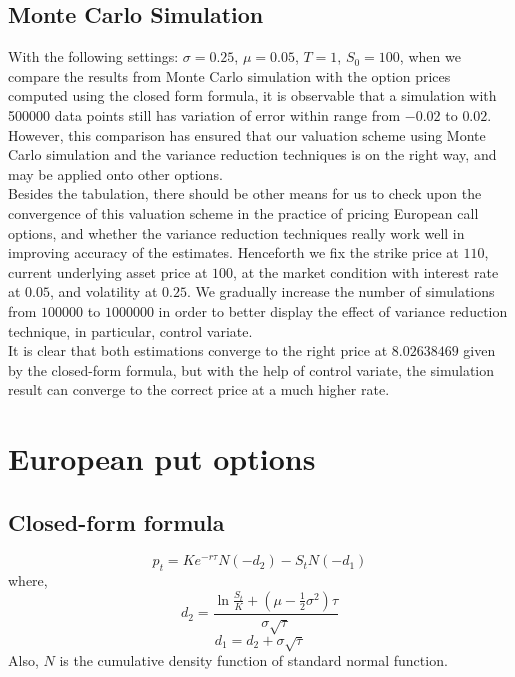 \subsection*{Monte Carlo Simulation}
With the following settings: $\sigma = 0.25$, $\mu = 0.05$, $T = 1$, $S_{0} = 100$, 
when we compare the results from Monte Carlo simulation with the option prices computed using the closed form formula, it is observable that a simulation with 500000 data points still has variation of error within range from $-0.02$ to $0.02$. However, this comparison has ensured that our valuation scheme using Monte Carlo simulation and the variance reduction techniques is on the right way, and may be applied onto other options.\\
Besides the tabulation, there should be other means for us to check upon the convergence of this valuation scheme in the practice of pricing European call options, and whether  the variance reduction techniques really work well in improving accuracy of the estimates. Henceforth we fix the strike price at $110$, current underlying asset price at $100$, at the market condition with interest rate at $0.05$, and volatility at $0.25$. We gradually increase the number of simulations from $100000$ to $1000000$ in order to better display the effect of variance reduction technique, in particular, control variate.
\\
It is clear that both estimations converge to the right price at $8.02638469$ given by the closed-form formula, but with the help of control variate, the simulation result can converge to the correct price at a much higher rate.

\section*{European put options}

\subsection*{Closed-form formula}
$$p_{t} = Ke^{-r\tau} N(-d_{2}) - S_{t} N(-d_{1})$$
where,
$$d_{2} = \frac{\ln{\frac{S_{t}}{K}} + (\mu - \frac{1}{2}\sigma^{2})\tau}{\sigma\sqrt{\tau}}$$
$$d_{1} = d_{2} + \sigma\sqrt{\tau}$$
Also, $N$ is the cumulative density function of standard normal function.

